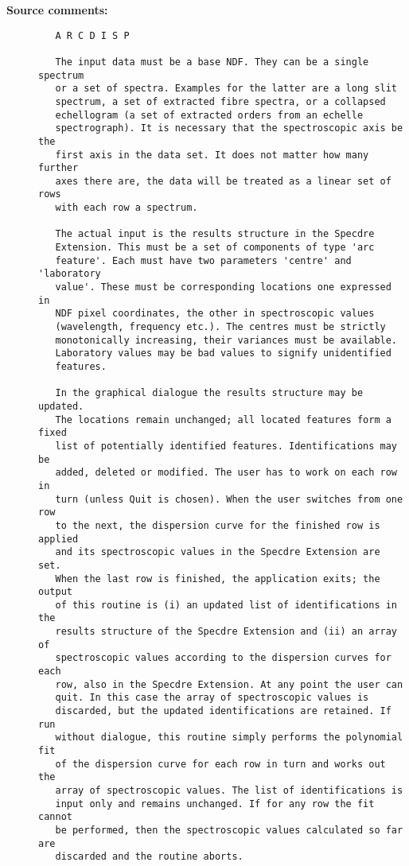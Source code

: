 \begin{description}
\begin{description}
\end{description}

\item [{\bf Source comments:}]
\begin{verbatim}
   A R C D I S P

   The input data must be a base NDF. They can be a single spectrum
   or a set of spectra. Examples for the latter are a long slit
   spectrum, a set of extracted fibre spectra, or a collapsed
   echellogram (a set of extracted orders from an echelle
   spectrograph). It is necessary that the spectroscopic axis be the
   first axis in the data set. It does not matter how many further
   axes there are, the data will be treated as a linear set of rows
   with each row a spectrum.

   The actual input is the results structure in the Specdre
   Extension. This must be a set of components of type 'arc
   feature'. Each must have two parameters 'centre' and 'laboratory
   value'. These must be corresponding locations one expressed in
   NDF pixel coordinates, the other in spectroscopic values
   (wavelength, frequency etc.). The centres must be strictly
   monotonically increasing, their variances must be available.
   Laboratory values may be bad values to signify unidentified
   features.

   In the graphical dialogue the results structure may be updated.
   The locations remain unchanged; all located features form a fixed
   list of potentially identified features. Identifications may be
   added, deleted or modified. The user has to work on each row in
   turn (unless Quit is chosen). When the user switches from one row
   to the next, the dispersion curve for the finished row is applied
   and its spectroscopic values in the Specdre Extension are set.
   When the last row is finished, the application exits; the output
   of this routine is (i) an updated list of identifications in the
   results structure of the Specdre Extension and (ii) an array of
   spectroscopic values according to the dispersion curves for each
   row, also in the Specdre Extension. At any point the user can
   quit. In this case the array of spectroscopic values is
   discarded, but the updated identifications are retained. If run
   without dialogue, this routine simply performs the polynomial fit
   of the dispersion curve for each row in turn and works out the
   array of spectroscopic values. The list of identifications is
   input only and remains unchanged. If for any row the fit cannot
   be performed, then the spectroscopic values calculated so far are
   discarded and the routine aborts.


\end{verbatim}
\end{description}
